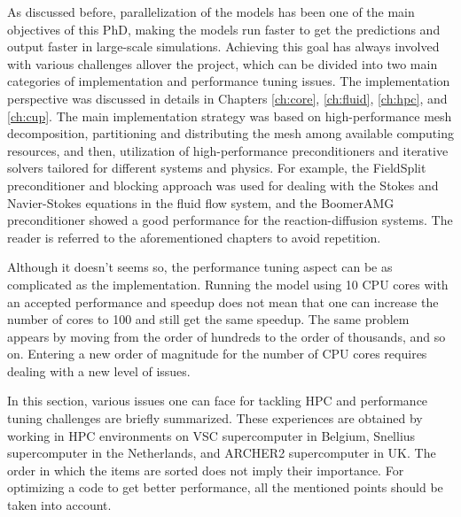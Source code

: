 As discussed before, parallelization of the models has been one of the main objectives of this PhD, making the models run faster to get the predictions and output faster in large-scale simulations. Achieving this goal has always involved with various challenges allover the project, which can be divided into two main categories of implementation and performance tuning issues. The implementation perspective was discussed in details in Chapters \ref{ch:core}, \ref{ch:fluid}, \ref{ch:hpc}, and \ref{ch:cup}. The main implementation strategy was based on high-performance mesh decomposition, partitioning and distributing the mesh among available  computing resources, and then, utilization of high-performance preconditioners and iterative solvers tailored for different systems and physics. For example, the FieldSplit preconditioner and blocking approach was used for dealing with the Stokes and Navier-Stokes equations in the fluid flow system, and the BoomerAMG preconditioner showed a good performance for the reaction-diffusion systems. The reader is referred to the aforementioned chapters to avoid repetition. 

Although it doesn't seems so, the performance tuning aspect can be as complicated as the implementation. Running the model using 10 CPU cores with an accepted performance and speedup does not mean that one can increase the number of cores to 100 and still get the same speedup. The same problem appears by moving from the order of hundreds to the order of thousands, and so on. Entering a new order of magnitude for the number of CPU cores requires dealing with a new level of issues. 

In this section, various issues one can face for tackling HPC and performance tuning challenges are briefly summarized. These experiences are obtained by working in HPC environments on VSC supercomputer in Belgium, Snellius supercomputer in the Netherlands, and ARCHER2 supercomputer in UK. The order in which the items are sorted does not imply their importance. For optimizing a code to get better performance, all the mentioned points should be taken into account.

